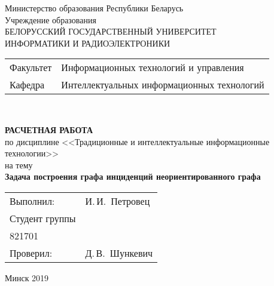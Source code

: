 \begin{titlepage}
  \begin{center}
    Министерство образования Республики Беларусь\\[1em]
    Учреждение образования\\
    БЕЛОРУССКИЙ ГОСУДАРСТВЕННЫЙ УНИВЕРСИТЕТ \\
    ИНФОРМАТИКИ И РАДИОЭЛЕКТРОНИКИ\\[1em]

    \begin{minipage}{\textwidth}
      \begin{flushleft}
        \begin{tabular}{ l l }
          Факультет & Информационных технологий и управления\\
          Кафедра   & Интеллектуальных информационных технологий
        \end{tabular}
      \end{flushleft}
    \end{minipage}\\[1em]

    \vspace{5em}


    \textbf{РАСЧЕТНАЯ РАБОТА}\\
    {по дисциплине <<Традиционные и интеллектуальные информационные технологии>>}\\
    на тему\\
    \textbf{\large Задача построения графа инциденций неориентированного графа }\\[1em]

    \vspace{10em}
    
    \begin{tabular}{ p{}p{} }
      Выполнил:& И.\,И.~Петровец \\[1em]
      Студент группы& \\
      821701 & \\
      Проверил: & Д.\,В.~Шункевич \\
     
    \end{tabular}
    
    \vfill
    {\normalsize Минск 2019}
  \end{center}
\end{titlepage}
